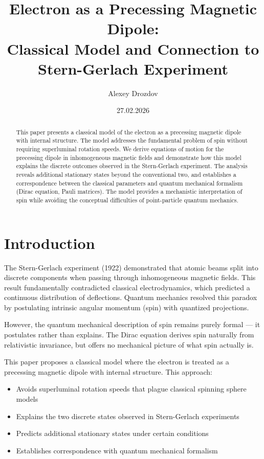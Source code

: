 \documentclass[12pt]{article}
\title{Electron as a Precessing Magnetic Dipole: \\ Classical Model and Connection to Stern-Gerlach Experiment}
\author{Alexey Drozdov}
\date{27.02.2026}
\begin{document}
\maketitle

\begin{abstract}
This paper presents a classical model of the electron as a precessing magnetic dipole with internal structure. The model addresses the fundamental problem of spin without requiring superluminal rotation speeds. We derive equations of motion for the precessing dipole in inhomogeneous magnetic fields and demonstrate how this model explains the discrete outcomes observed in the Stern-Gerlach experiment. The analysis reveals additional stationary states beyond the conventional two, and establishes a correspondence between the classical parameters and quantum mechanical formalism (Dirac equation, Pauli matrices). The model provides a mechanistic interpretation of spin while avoiding the conceptual difficulties of point-particle quantum mechanics.
\end{abstract}

\section{Introduction}

The Stern-Gerlach experiment (1922) demonstrated that atomic beams split into discrete components when passing through inhomogeneous magnetic fields. This result fundamentally contradicted classical electrodynamics, which predicted a continuous distribution of deflections. Quantum mechanics resolved this paradox by postulating intrinsic angular momentum (spin) with quantized projections.

However, the quantum mechanical description of spin remains purely formal — it postulates rather than explains. The Dirac equation derives spin naturally from relativistic invariance, but offers no mechanical picture of what spin actually is.

This paper proposes a classical model where the electron is treated as a precessing magnetic dipole with internal structure. This approach:
\begin{itemize}
\item Avoids superluminal rotation speeds that plague classical spinning sphere models
\item Explains the two discrete states observed in Stern-Gerlach experiments
\item Predicts additional stationary states under certain conditions
\item Establishes correspondence with quantum mechanical formalism
\end{itemize}
\end{document}
